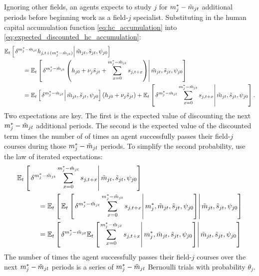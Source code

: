 Ignoring other fields, an agents expects to study $j$ for $m_j^* - \tilde{m}_{jt}$ additional periods before beginning work as a field-$j$ specialist.
Substituting in the human capital accumulation function \eqref{eq:hc_accumulation} into \eqref{eq:expected_discounted_hc_accumulation}:
\begin{align*}
    \mathbb{E}_t &\left[\left. 
        \delta^{m_j^* - \tilde{m}_{jt}}
        h_{j,t + (m_j^* - \tilde{m}_{jt})}
     \right\vert \tilde{m}_{jt}, \tilde{s}_{jt}, \psi_{j0} \right]
    \\
    &\quad\quad=
    \mathbb{E}_t \left[\left. 
        \delta^{m_j^* - \tilde{m}_{jt}}
        \left( 
            h_{j0} 
            + \nu_j \tilde{s}_{j t} 
            + \sum_{x=0}^{m_j^* - \tilde{m}_{jt}} 
            s_{j, t + x} \right)
     \right\vert \tilde{m}_{jt}, \tilde{s}_{jt}, \psi_{j0} \right]
    \\
    &\quad\quad=
    \mathbb{E}_t \left[\left. 
        \delta^{m_j^* - \tilde{m}_{jt}}        
     \right\vert \tilde{m}_{jt}, \tilde{s}_{jt}, \psi_{j0} \right] \left( h_{j0} + \nu_j \tilde{s}_{j t} \right)
    + 
    \mathbb{E}_t \left[\left. 
        \delta^{m_j^* - \tilde{m}_{jt}}
        \sum_{x=0}^{m_j^* - \tilde{m}_{jt}} s_{j, t + x}
     \right\vert \tilde{m}_{jt}, \tilde{s}_{jt}, \psi_{j0} \right].
\end{align*}
Two expectations are key. 
The first is the expected value of discounting the next $m_j^* - \tilde{m}_{jt}$ additional periods. 
The second is the expected value of the discounted term times the number of of times an agent successfully passes their field-$j$ courses during those $m_j^* - \tilde{m}_{jt}$ periods. 
To simplify the second probability, use the law of iterated expectations:
\begin{align*}
    \mathbb{E}_t &\left[\left. 
        \delta^{m_j^* - \tilde{m}_{jt}}
        \sum_{x=0}^{m_j^* - \tilde{m}_{jt}} s_{j, t + x}
     \right\vert \tilde{m}_{jt}, \tilde{s}_{jt}, \psi_{j0} \right]
    \\
    &\quad\quad=
    \mathbb{E}_t \left[\left. 
        \mathbb{E}_t \left[\left. 
            \delta^{m_j^* - \tilde{m}_{jt}}
            \sum_{x=0}^{m_j^* - \tilde{m}_{jt}} s_{j, t + x}
         \right\vert m_j^*, \tilde{m}_{jt}, \tilde{s}_{jt}, \psi_{j0} \right]
     \right\vert \tilde{m}_{jt}, \tilde{s}_{jt}, \psi_{j0} \right]
    \\
    &\quad\quad=
    \mathbb{E}_t \left[\left. 
        \delta^{m_j^* - \tilde{m}_{jt}}
        \mathbb{E}_t \left[\left. 
            \sum_{x=0}^{m_j^* - \tilde{m}_{jt}} s_{j, t + x}
         \right\vert m_j^*, \tilde{m}_{jt}, \tilde{s}_{jt}, \psi_{j0} \right]
     \right\vert \tilde{m}_{jt}, \tilde{s}_{jt}, \psi_{j0} \right]
\end{align*}
The number of times the agent successfully passes their field-$j$ courses over the next $m_j^* - \tilde{m}_{jt}$ periods is a series of $m_j^* - \tilde{m}_{jt}$ Bernoulli trials with probability $\theta_j$. 
